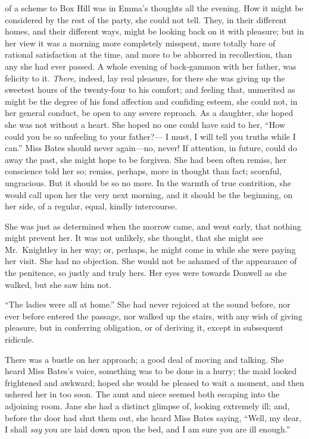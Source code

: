  of a scheme to Box Hill was in Emma's thoughts all
the evening.  How it might be considered by the rest of the party,
she could not tell.  They, in their different homes, and their different
ways, might be looking back on it with pleasure; but in her view it
was a morning more completely misspent, more totally bare of rational
satisfaction at the time, and more to be abhorred in recollection,
than any she had ever passed.  A whole evening of back-gammon with
her father, was felicity to it.  \emph{There}, indeed, lay real pleasure,
for there she was giving up the sweetest hours of the twenty-four
to his comfort; and feeling that, unmerited as might be the degree
of his fond affection and confiding esteem, she could not, in her
general conduct, be open to any severe reproach.  As a daughter,
she hoped she was not without a heart.  She hoped no one could
have said to her, ``How could you be so unfeeling to your father?---%
I must, I will tell you truths while I can.''  Miss Bates should
never again---no, never!  If attention, in future, could do away
the past, she might hope to be forgiven.  She had been often remiss,
her conscience told her so; remiss, perhaps, more in thought
than fact; scornful, ungracious.  But it should be so no more.
In the warmth of true contrition, she would call upon her the
very next morning, and it should be the beginning, on her side,
of a regular, equal, kindly intercourse.

She was just as determined when the morrow came, and went early,
that nothing might prevent her.  It was not unlikely, she thought,
that she might see Mr.\ Knightley in her way; or, perhaps, he might
come in while she were paying her visit.  She had no objection.
She would not be ashamed of the appearance of the penitence, so justly
and truly hers.  Her eyes were towards Donwell as she walked, but she
saw him not.

``The ladies were all at home.''  She had never rejoiced at the sound
before, nor ever before entered the passage, nor walked up the stairs,
with any wish of giving pleasure, but in conferring obligation,
or of deriving it, except in subsequent ridicule.

There was a bustle on her approach; a good deal of moving and talking.
She heard Miss Bates's voice, something was to be done in a hurry;
the maid looked frightened and awkward; hoped she would be pleased
to wait a moment, and then ushered her in too soon.  The aunt and
niece seemed both escaping into the adjoining room.  Jane she had
a distinct glimpse of, looking extremely ill; and, before the door
had shut them out, she heard Miss Bates saying, ``Well, my dear,
I shall \emph{say} you are laid down upon the bed, and I am sure you are
ill enough.''

